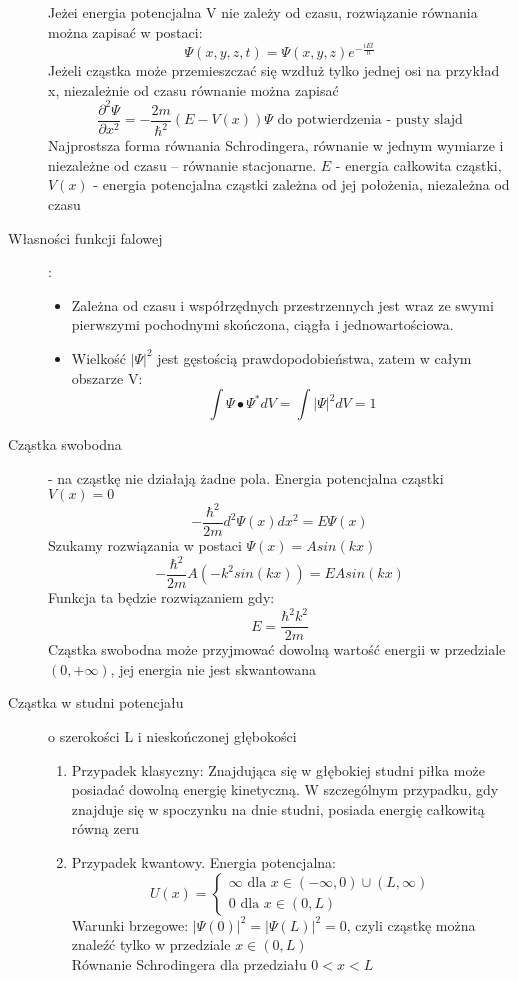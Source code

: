 \documentclass[a4paper,11pt]{article}
\begin{document}
\begin{description}
  Jeżei energia potencjalna V nie zależy od czasu, rozwiązanie równania można zapisać w postaci:
  $$\Psi(x,y,z,t)=\Psi(x,y,z)e^{-\frac{iEt}{\hbar}}$$
  Jeżeli cząstka może przemieszczać się wzdłuż tylko jednej osi na przykład x, niezależnie od czasu równanie można zapisać 
  $$\frac{\partial^2\Psi}{\partial x^2}=-\frac{2m}{\hbar^2}\left(E-V(x)\right)\Psi \text{ do potwierdzenia - pusty slajd} $$
  Najprostsza forma równania Schrodingera, równanie w jednym wymiarze i niezależne od czasu -- równanie stacjonarne.
  $E$ - energia całkowita cząstki, $V(x)$ - energia potencjalna cząstki zależna od jej położenia, niezależna od czasu
\item[Własności funkcji falowej]:
  \begin{itemize}
  \item Zależna od czasu i współrzędnych przestrzennych jest wraz ze swymi pierwszymi pochodnymi skończona, ciągła i jednowartościowa.
  \item Wielkość $|\Psi|^2$ jest gęstością prawdopodobieństwa, zatem w całym obszarze V:
    $$\int\Psi\bullet\Psi^*dV=\int|\Psi|^2dV=1$$
  \end{itemize}
\item[Cząstka swobodna] - na cząstkę nie działają żadne pola. Energia potencjalna cząstki $V(x)=0$
  $$-\frac{\hbar^2}{2m}{d^2\Psi(x)}{dx^2} = E\Psi(x)$$
  Szukamy rozwiązania w postaci $\Psi(x)=Asin(kx)$
  $$-\frac{\hbar^2}{2m}A\left(-k^2sin(kx)\right)=EAsin(kx)$$
  Funkcja ta będzie rozwiązaniem gdy:
  $$E=\frac{\hbar^2k^2}{2m}$$
  Cząstka swobodna może przyjmować dowolną wartość energii w przedziale $(0,+\infty)$, jej energia nie jest skwantowana
\item[Cząstka w studni potencjału] o szerokości L i nieskończonej głębokości
  \begin{enumerate}
  \item Przypadek klasyczny: Znajdująca się w głębokiej studni piłka może posiadać dowolną energię kinetyczną. W szczególnym przypadku, gdy znajduje się w spoczynku na dnie studni, posiada energię całkowitą równą zeru
  \item Przypadek kwantowy. Energia potencjalna:
    $$U(x)=\left\{\begin{array}{l}\infty \text{ dla } x\in (-\infty,0)\cup(L,\infty)\\0\text{ dla }x\in(0,L)\end{array}\right.$$
    Warunki brzegowe: $|\Psi(0)|^2=|\Psi(L)|^2=0$, czyli cząstkę można znaleźć tylko w przedziale $x\in (0,L)$\\
    Równanie Schrodingera dla przedziału $0 < x < L$ 

\end{enumerate}
\end{description}
\end{document}

